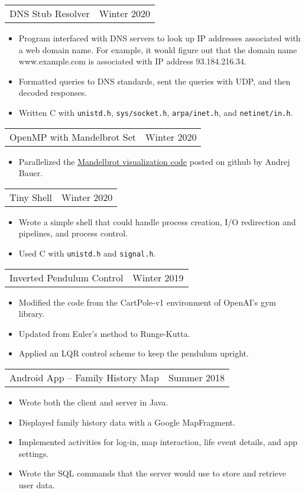 \documentclass{article}
\newenvironment{compactItemize}{
  \begin{itemize}[itemsep=0ex, parsep=0ex, partopsep=0ex, topsep= -7pt]
}{
  \end{itemize}
}
\newcommand{\project}[2]{
  \begingroup
  \setlength{\tabcolsep}{0ex}
  \begin{tabularx}{\linewidth}{X r}
    #1 & %
    #2\\ %
  \end{tabularx}%
  \endgroup%
}
\begin{document}
\project{DNS Stub Resolver}{Winter 2020}
\begin{compactItemize}
  \item Program interfaced with DNS servers to look up IP addresses associated with a web domain name.
        For example, it would figure out that the domain name www.example.com is associated with IP address 93.184.216.34.
  \item Formatted queries to DNS standards, sent the queries with UDP, and then decoded responses.
  \item Written C with \texttt{unistd.h}, \texttt{sys/socket.h}, \texttt{arpa/inet.h}, and \texttt{netinet/in.h}.
\end{compactItemize}
\medskip

\project{OpenMP with Mandelbrot Set}{Winter 2020}
\begin{compactItemize}
  \item Parallelized the \href{https://gist.github.com/andrejbauer/7919569}{Mandelbrot visualization code} posted on github by Andrej Bauer.
\end{compactItemize}
\medskip

\project{Tiny Shell}{Winter 2020}
\begin{compactItemize}
  \item Wrote a simple shell that could handle process creation, I/O redirection and pipelines, and process control.
  \item Used C with \texttt{unistd.h} and \texttt{signal.h}.
\end{compactItemize}
\medskip

\project{Inverted Pendulum Control}{Winter 2019}
\begin{compactItemize}
  \item Modified the code from the CartPole-v1 environment of OpenAI's gym library.
  \item Updated from Euler's method to Runge-Kutta.
  \item Applied an LQR control scheme to keep the pendulum upright.
\end{compactItemize}
\medskip

\project{Android App -- Family History Map}{Summer 2018}
\begin{compactItemize}
  \item Wrote both the client and server in Java.
  \item Displayed family history data with a Google MapFragment.
  \item Implemented activities for log-in, map interaction, life event details, and app settings.
  \item Wrote the SQL commands that the server would use to store and retrieve user data.
\end{compactItemize}
\end{document}
